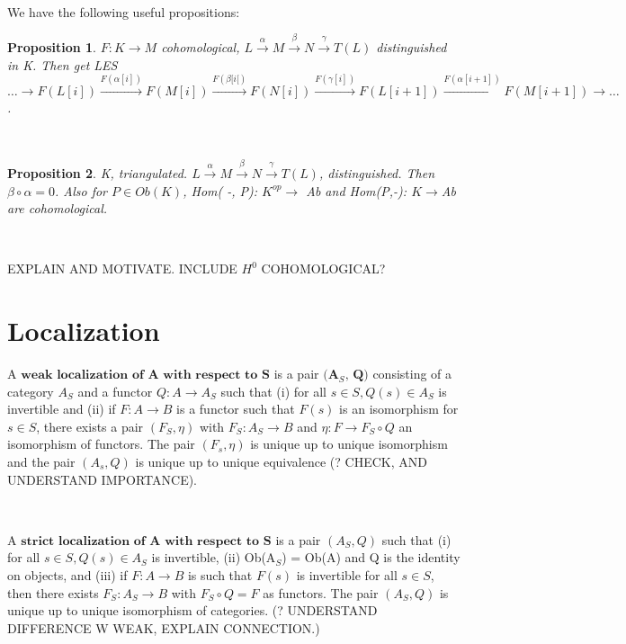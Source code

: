\documentclass[12pt]{amsart}    %
\newtheorem{proposition}{Proposition}
\theoremstyle{definition}
\begin{document}
\

We have the following useful propositions:
\

\begin{proposition} $F: K \rightarrow M$ cohomological, $L \xrightarrow {\alpha} M \xrightarrow{\beta} N \xrightarrow{\gamma} T(L)$ distinguished in K.  Then get LES $ \hdots \rightarrow F(L[i]) \xrightarrow{F(\alpha[i])} F(M[i]) \xrightarrow{F(\beta[i[)} F(N[i]) \xrightarrow{F(\gamma[i])} F(L[i+1]) \xrightarrow{F(\alpha[i+1])} F(M[i+1]) \rightarrow \hdots$.
\end{proposition}

\

\begin{proposition} K, triangulated. $L \xrightarrow{\alpha} M \xrightarrow{\beta} N \xrightarrow{\gamma} T(L)$, distinguished.  Then $\beta \circ \alpha = 0$. Also for $P \in Ob(K)$, Hom( -, P): $K^{op} \rightarrow$ Ab and Hom(P,-): $K \rightarrow $Ab are cohomological.
\end{proposition}

\

EXPLAIN AND MOTIVATE. INCLUDE $H^0$ COHOMOLOGICAL?

\section{Localization}


A $\textbf{weak localization of A with respect to S}$ is a pair $\textbf{(A$_S$, Q)}$ consisting of a category $A_S$ and a functor $Q: A \rightarrow A_S$ such that (i) for all $s \in S, Q(s) \in A_S$ is invertible and (ii) if $F: A \rightarrow B$ is a functor such that $F(s)$ is an isomorphism for $s \in S$, there exists a pair $(F_S, \eta)$ with $F_S: A_S \rightarrow B$ and $\eta: F \rightarrow F_S \circ Q$ an isomorphism of functors.  The pair $(F_s, \eta)$ is unique up to unique isomorphism and the pair $(A_s, Q)$ is unique up to unique equivalence (? CHECK, AND UNDERSTAND IMPORTANCE).

\

A $\textbf{strict localization of A with respect to S}$ is a pair $(A_S, Q)$ such that (i) for all $s \in S, Q(s) \in A_S$ is invertible, (ii) Ob(A$_S$) = Ob(A) and Q is the identity on objects, and (iii) if $F: A \rightarrow B$ is such that $F(s)$ is invertible for all $s \in S$, then there exists $F_S: A_S \rightarrow B$ with $F_S \circ Q = F$ as functors. The pair $(A_S,Q)$ is unique up to unique isomorphism of categories.  (? UNDERSTAND DIFFERENCE W WEAK, EXPLAIN CONNECTION.)
\end{document}
